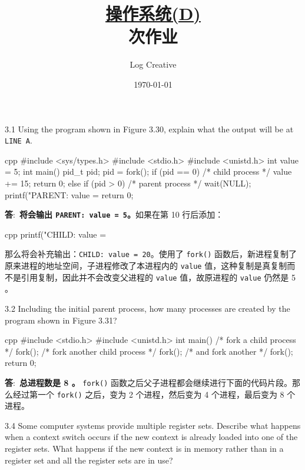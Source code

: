 \documentclass[12pt,a4paper]{article}
\newenvironment{problems}{\begin{list}{}{\renewcommand{\makelabel}[1]{\textbf{##1}\hfil}}}{\end{list}}
\providecommand{\ans}{\textbf{答}:~}
\begin{document}
\title{\normalsize \underline{操作系统(D)}\\ 次作业}
\author{Log Creative }
\date{\today}
\maketitle

\begin{problems}
    \item[3.1] Using the program shown in Figure 3.30, explain what the output will
    be at \texttt{LINE A}.
    \begin{code}{cpp}
#include <sys/types.h>
#include <stdio.h>
#include <unistd.h>
int value = 5;
int main()
{
    pid_t pid;
    pid = fork();
    if (pid == 0) { /* child process */
        value += 15;
        return 0;
    }
    else if (pid > 0) { /* parent process */
        wait(NULL);
        printf("PARENT: value = %
        return 0;
    }
}
    \end{code}

    \ans \textbf{将会输出 \texttt{PARENT: value = 5}。}如果在第 10 行后添加：
\begin{code}{cpp}
    printf("CHILD: value = %
\end{code}
    那么将会补充输出：\texttt{CHILD: value = 20}。使用了 \texttt{fork()} 函数后，新进程复制了原来进程的地址空间，子进程修改了本进程内的 \texttt{value} 值，这种复制是真复制而不是引用复制，因此并不会改变父进程的 \texttt{value} 值，故原进程的 \texttt{value} 仍然是 5 。
    \item[3.2] Including the initial parent process, how many processes are created by
    the program shown in Figure 3.31?
    \begin{code}{cpp}
#include <stdio.h>
#include <unistd.h>
int main()
{
    /* fork a child process */
    fork();
    /* fork another child process */
    fork();
    /* and fork another */
    fork();
    return 0;
}
    \end{code}

    \ans \textbf{总进程数是 8 。} \texttt{fork()} 函数之后父子进程都会继续进行下面的代码片段。那么经过第一个 \texttt{fork()} 之后，变为 2 个进程，然后变为 4 个进程，最后变为 8 个进程。
    \item[3.4] Some computer systems provide multiple register sets. Describe what
    happens when a context switch occurs if the new context is already loaded into one of the register sets. What happens if the new context
    is in memory rather than in a register set and all the register sets are in
    use?


\end{problems}
\end{document}
